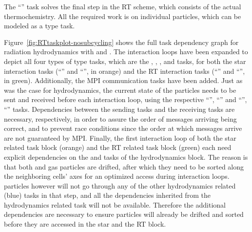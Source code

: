 The ``'' task solves the final step in the RT scheme, which consists of the
actual thermochemistry. All the required work is on individual particles, which can be modeled as a
 type task.

Figure~\ref{fig:RTtaskplot-nosubcycling} shows the full task dependency graph for radiation
hydrodynamics with \GEARRT and \swift. The interaction loops have been expanded to depict all four
types of  type tasks, which are the , ,
, and  tasks, for both the star interaction tasks
(``'' and ``'', in orange) and the RT interaction tasks
(``'' and ``'', in green). Additionally, the MPI
communication tasks have been added. Just as was the case for hydrodynamics, the current state of
the particles needs to be sent and received before each interaction loop, using the respective
``'', ``'' and ``'',
``'' tasks. Dependencies between the sending tasks and the receiving
tasks are necessary, respectively, in order to assure the order of messages arriving being correct,
and to prevent race conditions since the order at which messages arrive are not guaranteed by MPI.
Finally, the first interaction loop of both the star related task block (orange) and the RT related
task block (green) each need explicit dependencies on the  and  tasks of
the hydrodynamics block. The reason is that both  and  gas particles
are drifted, after which they need to be sorted along the neighboring cells' axes for an optimized
access during interaction loops.  particles however will not go through any of the
other hydrodynamics related (blue) tasks in that step, and all the dependencies inherited from the
hydrodynamics related task will not be available. Therefore the additional dependencies are
necessary to ensure particles will already be drifted and sorted before they are accessed in the
star and the RT block.



